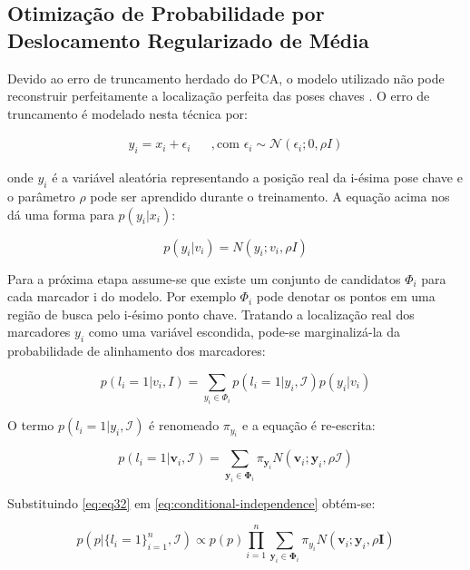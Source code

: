 {\subsection{Otimização de Probabilidade por Deslocamento Regularizado de Média}

Devido ao erro de truncamento herdado do PCA, o modelo utilizado não pode reconstruir perfeitamente a localização perfeita das poses chaves \cite{saragih2011deformable}. O erro de truncamento é modelado nesta técnica por:

\begin{align}
y_i = x_i + \epsilon_i & & , \text{com }  \epsilon_i \sim \mathcal{N}(\epsilon_i; 0, \rho I)
\end{align}

onde $y_i$ é a variável aleatória representando a posição real da i-ésima pose chave e o parâmetro $\rho$ pode ser aprendido durante o treinamento. A equação acima nos dá uma forma para $p(y_i | x_i)$:

\begin{equation}
p(y_i | v_i) = N(y_i; v_i, \rho I)
\end{equation}

Para a próxima etapa assume-se que existe um conjunto de candidatos $\Phi_i$ para cada marcador i do modelo. Por exemplo $\Phi_i$ pode denotar os pontos em uma região de busca pelo i-ésimo ponto chave. Tratando a localização real dos marcadores $y_i$ como uma variável escondida, pode-se marginalizá-la da probabilidade de alinhamento dos marcadores:

\begin{equation}
p(l_i = 1|v_i, I) = \sum_{y_i \in \Phi_i} p(l_i = 1| y_i, \mathcal{I})p(y_i|v_i)
\end{equation}

O termo $p(l_i = 1| y_i, \mathcal{I})$ é renomeado $\pi_{y_i}$ e a equação é re-escrita:

\begin{equation}
\label{eq:eq32}
p(l_i = 1|\mathbf{v}_i, \mathcal{I}) = \sum_{\mathbf{y}_i \in \mathbf{\Phi}_i} \pi_{\mathbf{y}_i} N(\mathbf{v}_i; \mathbf{y}_i, \rho \mathcal{I})
\end{equation}

Substituindo \ref{eq:eq32} em \ref{eq:conditional-independence}
 obtém-se:

\begin{equation}
p(p|\{l_i=1\}_{i=1}^n, \mathcal{I}) \varpropto p(p) \prod_{i=1}^n \sum_{\mathbf{y}_i \in \mathbf{\Phi}_i}
\pi_{y_i} N(\mathbf{v}_i; \mathbf{y}_i, \rho \mathbf{I})
\end{equation}

}
